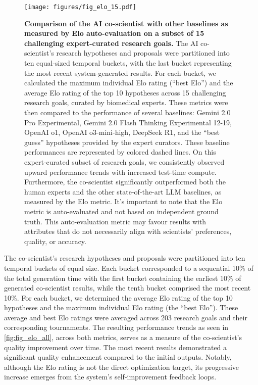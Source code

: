 \begin{figure}[ht!]
\centering
\texttt{[image: figures/fig\_elo\_15.pdf]}
\vspace{0.1cm}
\caption{\textbf{Comparison of the AI co-scientist with other baselines as measured by Elo auto-evaluation on a subset of 15 challenging expert-curated research goals.} The AI co-scientist's research hypotheses and proposals were partitioned into ten equal-sized temporal buckets, with the last bucket representing the most recent system-generated results. For each bucket, we calculated the maximum individual Elo rating (``best Elo'') and the average Elo rating of the top 10 hypotheses across 15 challenging research goals, curated by biomedical experts. These metrics were then compared to the performance of several baselines: Gemini 2.0 Pro Experimental, Gemini 2.0 Flash Thinking Experimental 12-19, OpenAI o1, OpenAI o3-mini-high, DeepSeek R1, and the ``best guess'' hypotheses provided by the expert curators. These baseline performances are represented by colored dashed lines. On this expert-curated subset of research goals, we consistently observed upward performance trends with increased test-time compute. Furthermore, the co-scientist significantly outperformed both the human experts and the other state-of-the-art LLM baselines, as measured by the Elo metric. It's important to note that the Elo metric is auto-evaluated and not based on independent ground truth. This auto-evaluation metric may favour results with attributes that do not necessarily align with scientists' preferences, quality, or accuracy.}
\label{fig:fig_elo}
\end{figure}

The co-scientist's research hypotheses and proposals were partitioned into ten temporal buckets of equal size. Each bucket corresponded to a sequential 10\% of the total generation time with the first bucket containing the earliest 10\% of generated co-scientist results, while the tenth bucket comprised the most recent 10\%. For each bucket, we determined the average Elo rating of the top 10 hypotheses and the maximum individual Elo rating (the ``best Elo''). These average and best Elo ratings were averaged across 203 research goals and their corresponding tournaments. The resulting performance trends as seen in \cref{fig:fig_elo_all}, across both metrics, serves as a measure of the co-scientist's quality improvement over time. The most recent results demonstrated a significant quality enhancement compared to the initial outputs. Notably, although the Elo rating is not the direct optimization target, its progressive increase emerges from the system's self-improvement feedback loops.

